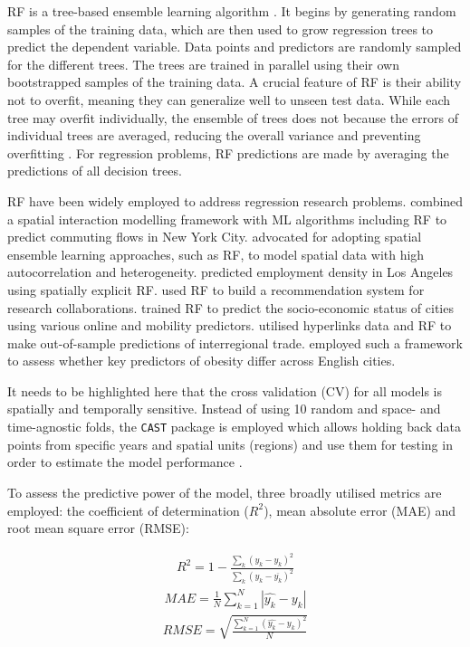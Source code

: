 \documentclass[
  authoryear,
  preprint,
  3p]{elsarticle}
\begin{document}
RF is a tree-based ensemble learning algorithm
\citep{breiman2001random}. It begins by generating random samples of the
training data, which are then used to grow regression trees to predict
the dependent variable. Data points and predictors are randomly sampled
for the different trees. The trees are trained in parallel using their
own bootstrapped samples of the training data. A crucial feature of RF
is their ability not to overfit, meaning they can generalize well to
unseen test data. While each tree may overfit individually, the ensemble
of trees does not because the errors of individual trees are averaged,
reducing the overall variance and preventing overfitting
\citep{last2002improving}. For regression problems, RF predictions are
made by averaging the predictions of all decision trees.

RF have been widely employed to address regression research problems.
\citet{pourebrahim2019trip} combined a spatial interaction modelling
framework with ML algorithms including RF to predict commuting flows in
New York City. \citet{sinha2019assessing} advocated for adopting spatial
ensemble learning approaches, such as RF, to model spatial data with
high autocorrelation and heterogeneity. \citet{creditspatial} predicted
employment density in Los Angeles using spatially explicit RF.
\citet{guns2014recommending} used RF to build a recommendation system
for research collaborations. \citet{ren2019predicting} trained RF to
predict the socio-economic status of cities using various online and
mobility predictors. \citet{tranos2023using} utilised hyperlinks data
and RF to make out-of-sample predictions of interregional trade.
\citet{zhou2023geography} employed such a framework to assess whether
key predictors of obesity differ across English cities.

It needs to be highlighted here that the cross validation (CV) for all
models is spatially and temporally sensitive. Instead of using 10 random
and space- and time-agnostic folds, the \texttt{CAST} package is
employed which allows holding back data points from specific years and
spatial units (regions) and use them for testing in order to estimate
the model performance \citep{meyer2018improving}.

To assess the predictive power of the model, three broadly utilised
metrics are employed: the coefficient of determination (\(R^2\)), mean
absolute error (MAE) and root mean square error (RMSE):

\begin{align}
R^2 = 1 - \frac{\sum_{k} (y_{k} - \hat{y_{k}})^2} {\sum_{k} (y_{k} - \overline{y_{k}})^2} \label{eq:rsquared}
\end{align} \begin{align}
MAE = \frac{1}{N} \sum_{k = 1}^{N} |\hat{y_{k}} - y_{k}| \label{eq:mae}
\end{align} \begin{align}
RMSE =  \sqrt{\frac{\sum_{k = 1}^{N} (\hat{y_{k}} - y_{k})^2} {N}} \label{eq:rmse}
\end{align}
\end{document}
